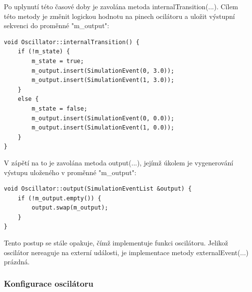 Po uplynutí této časové doby je zavolána metoda internalTransition(...). Cílem této metody je změnit logickou hodnotu na pinech ocilátoru a uložit výstupní sekvenci do proměnné "m\_output":

\begin{lstlisting}
void Oscillator::internalTransition() {
	if (!m_state) {
		m_state = true;
		m_output.insert(SimulationEvent(0, 3.0));
		m_output.insert(SimulationEvent(1, 3.0));
	}
	else {
		m_state = false;
		m_output.insert(SimulationEvent(0, 0.0));
		m_output.insert(SimulationEvent(1, 0.0));
	}
}
\end{lstlisting}

V zápětí na to je zavolána metoda output(...), jejímž úkolem je vygenerování výstupu uloženého v proměnné "m\_output":

\begin{lstlisting}
void Oscillator::output(SimulationEventList &output) {
	if (!m_output.empty()) {
		output.swap(m_output);
	}
}
\end{lstlisting}

Tento postup se stále opakuje, čímž implementuje funkci oscilátoru. Jelikož oscilátor nereaguje na externí události, je implementace metody externalEvent(...) prázdná.

\subsubsection{Konfigurace oscilátoru}

